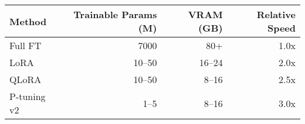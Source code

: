 \begin{tabular}{lrrr}
\toprule
Method & Trainable Params (M) & VRAM (GB) & Relative Speed \\
\midrule
Full FT & 7000 & 80+ & 1.0x \\
LoRA & 10--50 & 16--24 & 2.0x \\
QLoRA & 10--50 & 8--16 & 2.5x \\
P-tuning v2 & 1--5 & 8--16 & 3.0x \\
\bottomrule
\end{tabular}
